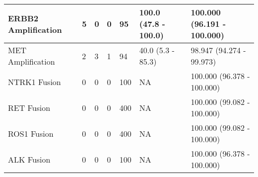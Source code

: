 \begin{tabular}{|l|l|l|l|l|l|l|}
ERBB2 Amplification         &    5 &    0 &    0 &     95 &  100.0 (47.8 - 100.0) &  100.000 (96.191 - 100.000) \\ \hline
MET Amplification           &    2 &    3 &    1 &     94 &     40.0 (5.3 - 85.3) &    98.947 (94.274 - 99.973) \\ \hline
NTRK1 Fusion                &    0 &    0 &    0 &    100 &                    NA &  100.000 (96.378 - 100.000) \\ \hline
RET Fusion                  &    0 &    0 &    0 &    400 &                    NA &  100.000 (99.082 - 100.000) \\ \hline
ROS1 Fusion                 &    0 &    0 &    0 &    400 &                    NA &  100.000 (99.082 - 100.000) \\ \hline
ALK Fusion                  &    0 &    0 &    0 &    100 &                    NA &  100.000 (96.378 - 100.000) \\ \hline
\end{tabular}